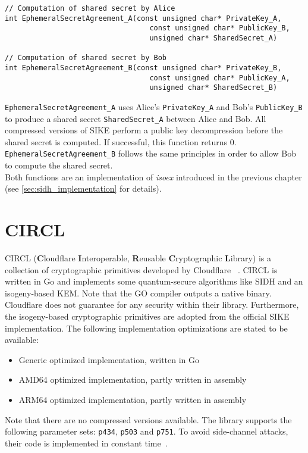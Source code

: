 \begin{lstlisting}[]
// Computation of shared secret by Alice
int EphemeralSecretAgreement_A(const unsigned char* PrivateKey_A, 
								  const unsigned char* PublicKey_B,
								  unsigned char* SharedSecret_A)
								  
// Computation of shared secret by Bob
int EphemeralSecretAgreement_B(const unsigned char* PrivateKey_B, 
								  const unsigned char* PublicKey_A,
								  unsigned char* SharedSecret_B)
\end{lstlisting}
\texttt{EphemeralSecretAgreement\_A} uses Alice's \texttt{PrivateKey\_A} and Bob's \texttt{PublicKey\_B} to produce a shared secret \texttt{SharedSecret\_A} between Alice and Bob. All compressed versions of \gls{SIKE} perform a public key decompression before the shared secret is computed. If successful, this function returns 0. \texttt{EphemeralSecretAgreement\_B} follows the same principles in order to allow Bob to compute the shared secret.\\
Both functions are an implementation of \textit{isoex} introduced in the previous chapter (see \autoref{sec:sidh_implementation} for details).
\newpage
\section{\gls{CIRCL}} \label{sec:circl_description}

\gls{CIRCL} (\textbf{C}loudflare \textbf{I}nteroperable, \textbf{R}eusable \textbf{C}ryptographic \textbf{L}ibrary) is a collection of cryptographic primitives developed by Cloudflare ~\parencite{circl2020github}. \gls{CIRCL} is written in Go and implements some quantum-secure algorithms like \gls{SIDH} and an isogeny-based \gls{KEM}. Note that the GO compiler outputs a native binary.  Cloudflare does not guarantee for any security within their library. Furthermore, the isogeny-based cryptographic primitives are adopted from the official \gls{SIKE} implementation. The following implementation optimizations are stated to be available:

\begin{itemize}
  \item Generic optimized implementation, written in Go 
  \item AMD64 optimized implementation, partly written in assembly
  \item ARM64 optimized implementation, partly written in assembly
\end{itemize}
Note that there are no compressed versions available. The library supports the following parameter sets: \texttt{p434}, \texttt{p503} and \texttt{p751}. To avoid side-channel attacks, their code is implemented in constant time~\parencite{circl2019intro}.

